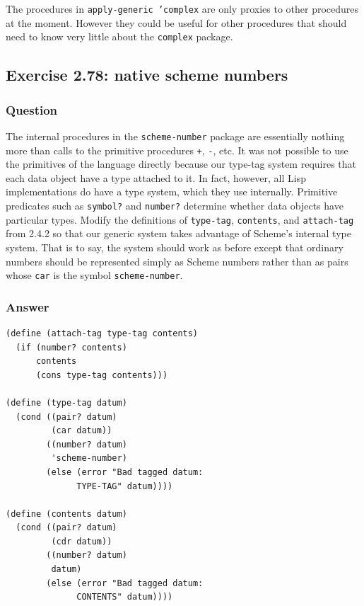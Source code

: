 \documentclass[final,fleqn,titlepage,twoside]{article}
\begin{document}
The procedures in \texttt{apply-generic 'complex} are only proxies to other
procedures at the moment. However they could be useful for other procedures that
should need to know very little about the \texttt{complex} package.

\subsection{Exercise 2.78: native scheme numbers}
\label{sec:org1811e23}
\subsubsection{Question}
\label{sec:orge492d22}
The internal procedures in the \texttt{scheme-number} package are essentially
nothing more than calls to the primitive procedures \texttt{+},
\texttt{-}, etc. It was not possible to use the primitives of the language
directly because our type-tag system requires that each data object have a type
attached to it. In fact, however, all Lisp implementations do have a type
system, which they use internally. Primitive predicates such as
\texttt{symbol?} and \texttt{number?} determine whether data objects have
particular types. Modify the definitions of \texttt{type-tag},
\texttt{contents}, and \texttt{attach-tag} from 2.4.2 so that our
generic system takes advantage of Scheme's internal type system. That is to say,
the system should work as before except that ordinary numbers should be
represented simply as Scheme numbers rather than as pairs whose \texttt{car}
is the symbol \texttt{scheme-number}.

\subsubsection{Answer}
\label{sec:org711c784}
\begin{verbatim}
(define (attach-tag type-tag contents)
  (if (number? contents)
      contents
      (cons type-tag contents)))

(define (type-tag datum)
  (cond ((pair? datum)
         (car datum))
        ((number? datum)
         'scheme-number)
        (else (error "Bad tagged datum: 
              TYPE-TAG" datum))))

(define (contents datum)
  (cond ((pair? datum)
         (cdr datum))
        ((number? datum)
         datum)
        (else (error "Bad tagged datum: 
              CONTENTS" datum))))
\end{verbatim}
\end{document}
